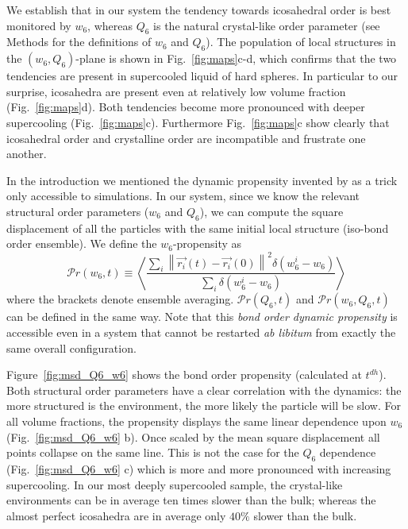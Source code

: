 We establish that in our system the tendency towards icosahedral order is best monitored by $w_6$, whereas $Q_6$ is the natural crystal-like order parameter (see Methods for the definitions of $w_6$ and $Q_6$). The population of local structures in the $(w_6,Q_6)$-plane is shown in Fig.~\ref{fig:maps}c-d, which confirms that the two tendencies are present in supercooled liquid of hard spheres. In particular to our surprise, icosahedra are present even at relatively low volume fraction (Fig.~\ref{fig:maps}d). Both tendencies become more pronounced with deeper supercooling (Fig.~\ref{fig:maps}c). Furthermore Fig.~\ref{fig:maps}c show clearly that icosahedral order and crystalline order are incompatible and frustrate one another.



In the introduction we mentioned the dynamic propensity invented by \citet{Widmer-Cooper2005} as a trick only accessible to simulations. In our system, since we know the relevant structural order parameters ($w_6$ and $Q_6$), we can compute the square displacement of all the particles with the same initial local structure (iso-bond order ensemble). We define the $w_6$-propensity as
\begin{equation}
	\mathcal{P}r(w_6, t) \equiv \left\langle \frac{
		\sum\limits_i{
			\left\|\vec{r_i}(t)-\vec{r_i}(0)\right\|^2 \delta(w_6^i-w_6)
			}
	}{
		\sum\limits_i{\delta(w_6^i-w_6)}
	}\right\rangle 
	\label{eq:bo_propensity}
\end{equation}
where the brackets denote ensemble averaging. $\mathcal{P}r(Q_6, t)$ and $\mathcal{P}r(w_6, Q_6, t)$ can be defined in the same way. Note that this \emph{bond order dynamic propensity} is accessible even in a system that cannot be restarted \emph{ab libitum} from exactly the same overall configuration.

Figure~\ref{fig:msd_Q6_w6} shows the bond order propensity (calculated at $t^{dh}$). Both structural order parameters have a clear correlation with the dynamics: the more structured is the environment, the more likely the particle will be slow. For all volume fractions, the propensity displays the same linear dependence upon $w_6$ (Fig.~\ref{fig:msd_Q6_w6} b). Once scaled by the mean square displacement all points collapse on the same line. This is not the case for the $Q_6$ dependence (Fig.~\ref{fig:msd_Q6_w6} c) which is more and more pronounced with increasing supercooling. In our most deeply supercooled sample, the crystal-like environments can be in average ten times slower than the bulk; whereas the almost perfect icosahedra are in average only $40\%$ slower than the bulk.

